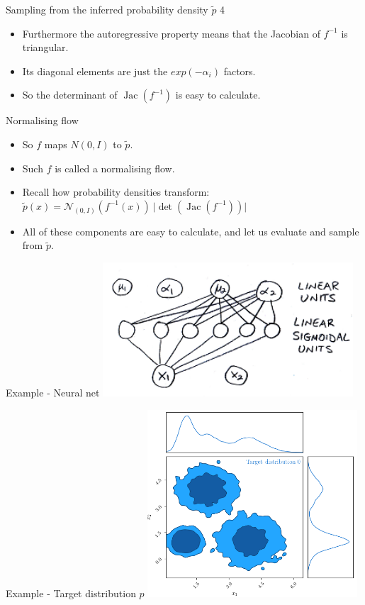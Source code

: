 \documentclass[usenames,dvipsnames]{beamer}
\DeclareMathOperator{\jac}{Jac}
\begin{document}
\begin{frame}{Sampling from the inferred probability density $\tilde{p}$ 4}
    \begin{itemize}
      \item{Furthermore the autoregressive property means that the Jacobian of $f^{-1}$ is triangular.}
	\item{Its diagonal elements are just the $exp(-\alpha_i)$ factors.}
	\item{So the determinant of $\jac(f^{-1})$ is easy to calculate.}
    \end{itemize}
\end{frame}

\begin{frame}{Normalising flow}
    \begin{itemize}
      \item{So $f$ maps $N(0, I)$ to $\tilde{p}$.}
	\item{Such $f$ is called a normalising flow.}
	\item{Recall how probability densities transform: \\
	$\tilde{p}(x) = \mathcal{N}_{(0, I)}(f^{-1}(x)) \ \lvert \det(\jac(f^{-1})) \rvert$}
	\item{All of these components are easy to calculate, and let us evaluate and sample from $\tilde{p}$.}
    \end{itemize}
\end{frame}

\begin{frame}{Example - Neural net}
     \centering
     \includegraphics[height=5cm]{image_06}
\end{frame}

\begin{frame}{Example - Target distribution $p$}
     \centering
     \includegraphics[height=7cm]{image_07}
\end{frame}
\end{document}
